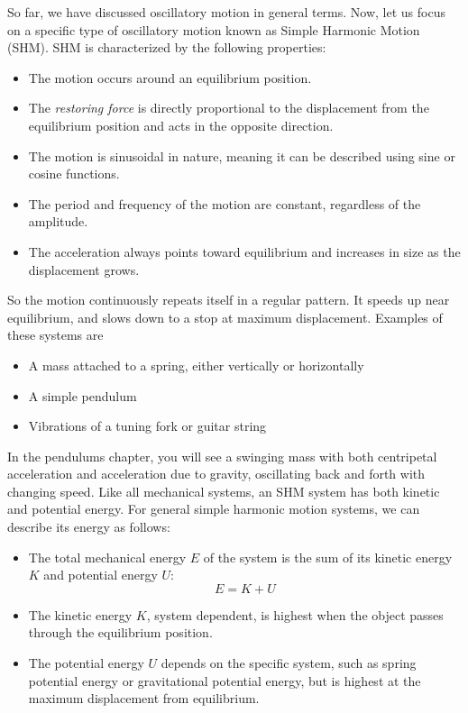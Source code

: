 So far, we have discussed oscillatory motion in general terms. Now, let us focus
on a specific type of oscillatory motion known as Simple Harmonic Motion (SHM). SHM
is characterized by the following properties:
\begin{itemize}
	\item The motion occurs around an equilibrium position.

	\item The \emph{restoring force} is directly proportional to the displacement
		from the equilibrium position and acts in the opposite direction.

	\item The motion is sinusoidal in nature, meaning it can be described using
		sine or cosine functions.

	\item The period and frequency of the motion are constant, regardless of the
		amplitude.

	\item The acceleration always points toward equilibrium and increases in size as
		the displacement grows.
\end{itemize}
So the motion continuously repeats itself in a regular pattern. It speeds up near equilibrium,
and slows down to a stop at maximum displacement. Examples of these systems are
\begin{itemize}
	\item A mass attached to a spring, either vertically or horizontally

	\item A simple pendulum

	\item Vibrations of a tuning fork or guitar string
\end{itemize}

In the pendulums chapter, you will see a swinging mass with both
centripetal acceleration and acceleration due to gravity, oscillating back
and forth with changing speed.  Like all mechanical systems, an SHM
system has both kinetic and potential energy. For general simple harmonic motion
systems, we can describe its energy as follows:
\begin{itemize}
	\item The total mechanical energy $E$ of the system is the sum of its kinetic energy
		$K$ and potential energy $U$:
		\[
			E = K + U
		\]

	\item The kinetic energy $K$, system dependent, is highest when the object passes
		through the equilibrium position.

	\item The potential energy $U$ depends on the specific system, such as spring
		potential energy or gravitational potential energy, but is highest at the maximum
		displacement from equilibrium.
\end{itemize}

